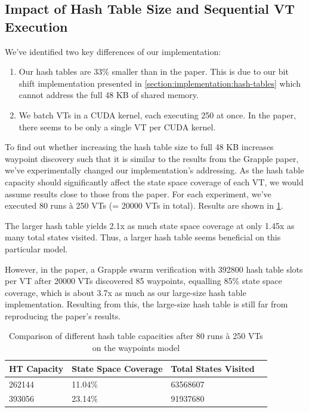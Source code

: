 \documentclass[
fancyheadings, %
%
%
]{stsreprt}
\begin{document}
\subsection{Impact of Hash Table Size and Sequential VT Execution}

We've identified two key differences of our implementation:
\begin{enumerate}
    \item Our hash tables are 33\% smaller than in the paper.
          This is due to our bit shift implementation presented in \cref{section:implementation:hash-tables} which cannot address the full 48 KB of shared memory.
    \item We batch VTs in a CUDA kernel, each executing 250 at once.
          In the paper, there seems to be only a single VT per CUDA kernel.
\end{enumerate}

To find out whether increasing the hash table size to full 48 KB increases waypoint discovery such that it is similar to the results from the Grapple paper, we've experimentally changed our implementation's addressing.
As the hash table capacity should significantly affect the state space coverage of each VT, we would assume results close to those from the paper.
For each experiment, we've executed 80 runs à 250 VTs (= \num{20000} VTs in total).
Results are shown in \cref{table:EXP-02}.

The larger hash table yields 2.1x as much state space coverage at only 1.45x as many total states visited.
Thus, a larger hash table seems beneficial on this particular model.

However, in the paper, a Grapple swarm verification with \num{392800} hash table slots per VT after \num{20000} VTs discovered 85 waypoints, equalling 85\% state space coverage, which is about 3.7x as much as our large-size hash table implementation.
Resulting from this, the large-size hash table is still far from reproducing the paper's results.

\begin{table}[h]
    \caption{Comparison of different hash table capacities after 80 runs à 250 VTs on the waypoints model}
    \label{table:EXP-02}
    \centering
    \begin{tabular}{l l l l}
        \toprule
        HT Capacity  & State Space Coverage & Total States Visited \\
        \midrule
        \num{262144} & 11.04\%              & \num{63568607}       \\
        \num{393056} & 23.14\%              & \num{91937680}       \\
        \bottomrule
    \end{tabular}
\end{table}
\end{document}
